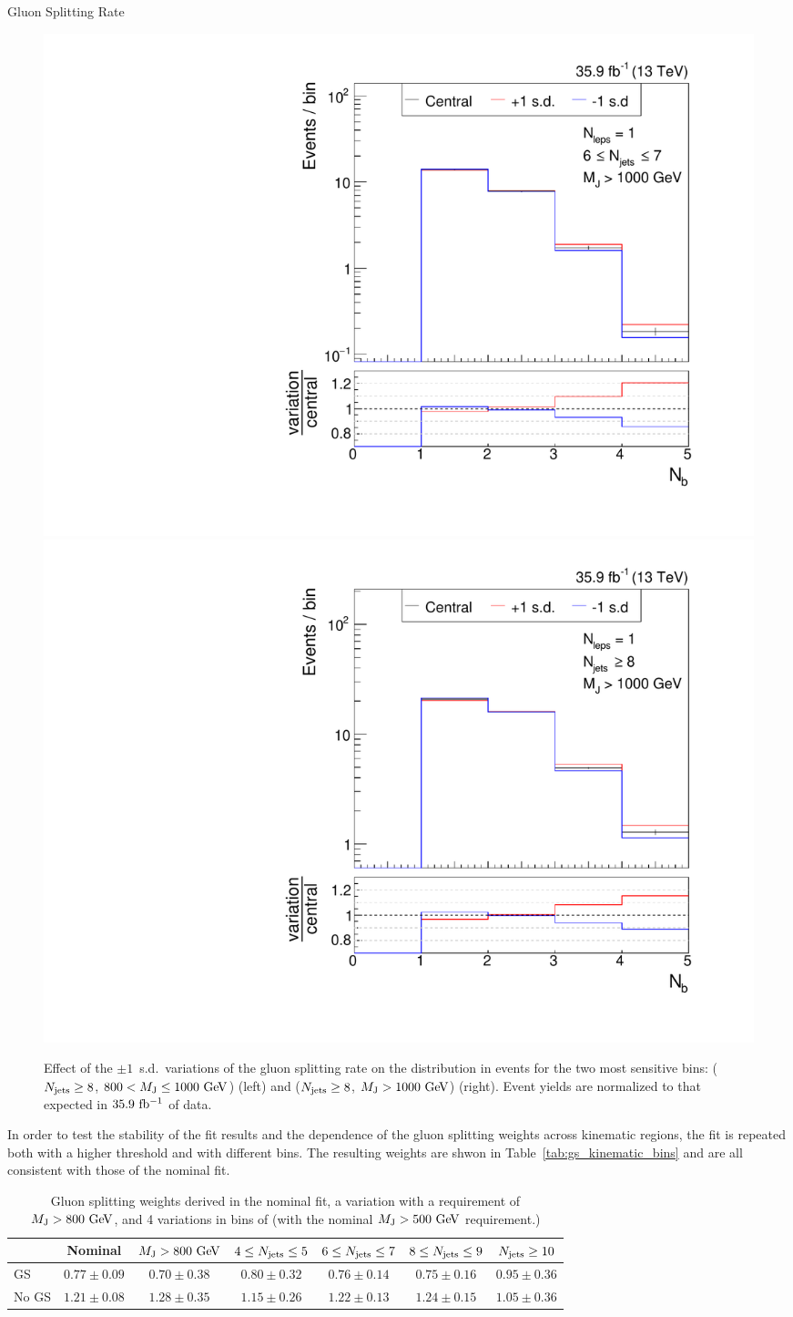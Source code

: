 \begin{section}{Gluon Splitting Rate}
\begin{figure}[tbp!]
\begin{center}
\includegraphics[angle=0,width=0.45\columnwidth]{fig/bin20_ttbar_gs_mconly.pdf}
\includegraphics[angle=0,width=0.45\columnwidth]{fig/bin21_ttbar_gs_mconly.pdf}
\end{center}
\caption{Effect of the $\pm 1$~s.d.\ variations of the gluon splitting rate on the \Nb distribution in \ttbar events for the two most sensitive bins: ($N_{\mathrm{jets}} \geq 8$, $800 < M_{\mathrm{J}} \leq 1000~\mathrm{Ge\kern -0.1em V}$) (left) and ($N_{\mathrm{jets}} \geq 8$, $M_{\mathrm{J}} > 1000~\mathrm{Ge\kern -0.1em V}$) (right).
Event yields are normalized to that expected in $35.9~\mathrm{fb^{-1}}$ of data.}
\label{fig:gs_variations}
\end{figure}

In order to test the stability of the fit results and the dependence of the gluon splitting weights across kinematic regions, the \dRbb fit is repeated both with a higher \MJ threshold and with different \Njets bins. 
The resulting weights are shwon in Table~\ref{tab:gs_kinematic_bins} and are all consistent with those of the nominal fit.

\begin{table}[tb!]
\setlength\tabcolsep{3pt}
\centering
\begin{tabular}{l|cccccc}
 & Nominal & $M_{\mathrm{J}} > 800~\mathrm{Ge\kern -0.1em V}$ & $4 \leq N_{\mathrm{jets}} \leq 5$ & $6 \leq N_{\mathrm{jets}} \leq 7$ & $8 \leq N_{\mathrm{jets}} \leq 9$ & $N_{\mathrm{jets}} \geq 10$ \\
\hline
GS    & $0.77 \pm 0.09$ & $0.70 \pm 0.38$ & $ 0.80 \pm 0.32$  & $ 0.76 \pm 0.14$ & $ 0.75 \pm 0.16$  & $ 0.95 \pm 0.36$ \\
No GS & $1.21 \pm 0.08$ & $1.28 \pm 0.35$ & $ 1.15 \pm 0.26$  & $ 1.22 \pm 0.13$ & $ 1.24 \pm 0.15$  & $ 1.05 \pm 0.36$ \\
\end{tabular}
\caption{Gluon splitting weights derived in the nominal fit, a variation with a requirement of $M_{\mathrm{J}} > 800~\mathrm{Ge\kern -0.1em V}$, and 4 variations in bins of \Njets (with the nominal $M_{\mathrm{J}} > 500~\mathrm{Ge\kern -0.1em V}$ requirement.)}
\label{tab:GS_variations}
\end{table}

\end{section}

